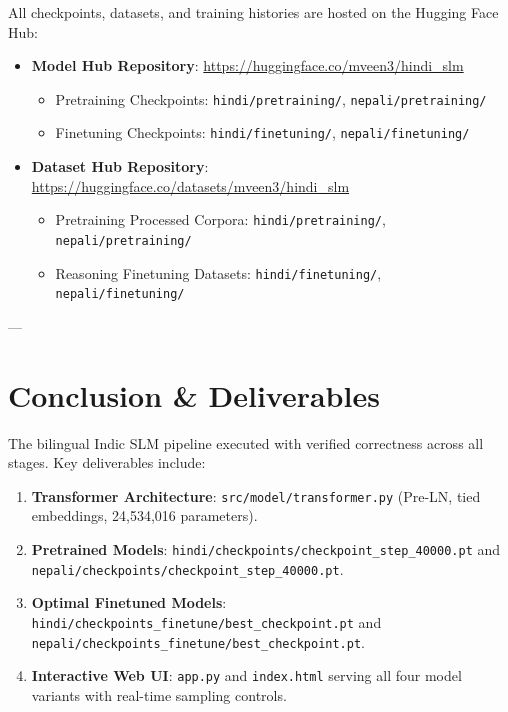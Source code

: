 \documentclass[11pt,a4paper]{article}
\begin{document}
All checkpoints, datasets, and training histories are hosted on the Hugging Face Hub:
\begin{itemize}[noitemsep]
    \item \textbf{Model Hub Repository}: \url{https://huggingface.co/mveen3/hindi_slm}
    \begin{itemize}[noitemsep]
        \item Pretraining Checkpoints: \texttt{hindi/pretraining/}, \texttt{nepali/pretraining/}
        \item Finetuning Checkpoints: \texttt{hindi/finetuning/}, \texttt{nepali/finetuning/}
    \end{itemize}
    \item \textbf{Dataset Hub Repository}: \url{https://huggingface.co/datasets/mveen3/hindi_slm}
    \begin{itemize}[noitemsep]
        \item Pretraining Processed Corpora: \texttt{hindi/pretraining/}, \texttt{nepali/pretraining/}
        \item Reasoning Finetuning Datasets: \texttt{hindi/finetuning/}, \texttt{nepali/finetuning/}
    \end{itemize}
\end{itemize}

---

\section{Conclusion \& Deliverables}

The bilingual Indic SLM pipeline executed with verified correctness across all stages. Key deliverables include:
\begin{enumerate}[noitemsep]
    \item \textbf{Transformer Architecture}: \texttt{src/model/transformer.py} (Pre-LN, tied embeddings, 24,534,016 parameters).
    \item \textbf{Pretrained Models}: \texttt{hindi/checkpoints/checkpoint\_step\_40000.pt} and \texttt{nepali/checkpoints/checkpoint\_step\_40000.pt}.
    \item \textbf{Optimal Finetuned Models}: \texttt{hindi/checkpoints\_finetune/best\_checkpoint.pt} and \texttt{nepali/checkpoints\_finetune/best\_checkpoint.pt}.
    \item \textbf{Interactive Web UI}: \texttt{app.py} and \texttt{index.html} serving all four model variants with real-time sampling controls.
\end{enumerate}
\end{document}
